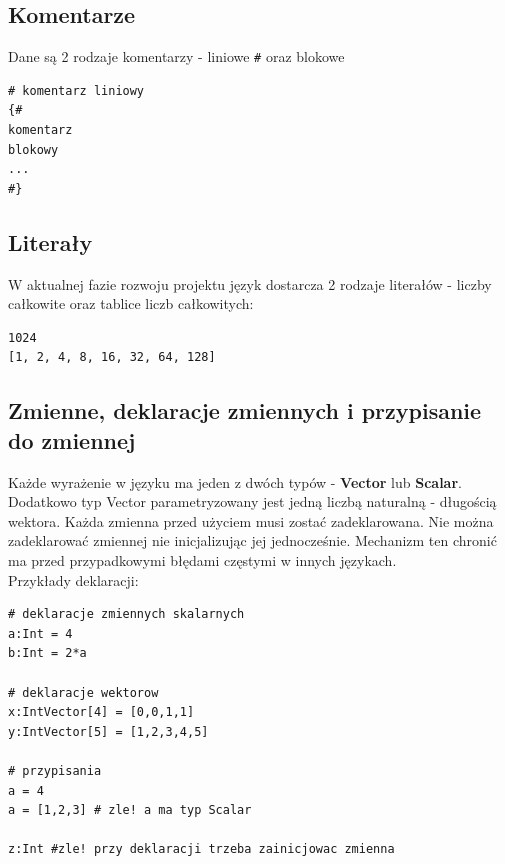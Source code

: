 \subsection{Komentarze}
Dane są 2 rodzaje komentarzy - liniowe \texttt{\#} oraz blokowe \texttt{}
\begin{lstlisting}[frame=single]
# komentarz liniowy
{#
komentarz
blokowy
...
#}
\end{lstlisting}

\subsection{Literały}
W aktualnej fazie rozwoju projektu język dostarcza 2 rodzaje literałów - liczby całkowite oraz tablice liczb całkowitych:
\begin{lstlisting}[frame=single]
1024
[1, 2, 4, 8, 16, 32, 64, 128]
\end{lstlisting}

\subsection{Zmienne, deklaracje zmiennych i przypisanie do zmiennej}
Każde wyrażenie w języku ma jeden z dwóch typów - \textbf{Vector} lub \textbf{Scalar}. Dodatkowo typ Vector parametryzowany jest jedną liczbą naturalną - długością wektora.
Każda zmienna przed użyciem musi zostać zadeklarowana. Nie można zadeklarować zmiennej nie inicjalizując jej jednocześnie. Mechanizm ten chronić ma przed przypadkowymi błędami częstymi w innych językach. \\
Przykłady deklaracji:
\begin{lstlisting}[frame=single]
# deklaracje zmiennych skalarnych
a:Int = 4
b:Int = 2*a

# deklaracje wektorow
x:IntVector[4] = [0,0,1,1]
y:IntVector[5] = [1,2,3,4,5]

# przypisania
a = 4
a = [1,2,3] # zle! a ma typ Scalar

z:Int #zle! przy deklaracji trzeba zainicjowac zmienna

\end{lstlisting}


